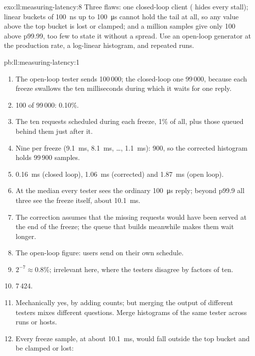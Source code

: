 \begin{solution}{exo:ll:measuring-latency:8}
Three flaws: one closed-loop client ( hides every stall); linear buckets of \qty{100}{\nano\second}
up to \qty{100}{\micro\second} cannot hold the tail at all, so any value above the top bucket is lost or clamped; and a
million samples give only 100 above p99.99, too few to state it without a spread. Use an open-loop generator at the
production rate, a log-linear histogram, and repeated runs.
\end{solution}

\begin{solution}{pb:ll:measuring-latency:1}
\begin{enumerate}
\item The open-loop tester sends 100\,000; the closed-loop one 99\,000, because each freeze swallows the ten
milliseconds during which it waits for one reply.
\item 100 of 99\,000: 0.10\%.
\item The ten requests scheduled during each freeze, 1\% of all, plus those queued behind them just after it.
\item Nine per freeze (\qty{9.1}{\milli\second}, \qty{8.1}{\milli\second}, \dots, \qty{1.1}{\milli\second}): 900, so the
corrected histogram holds 99\,900 samples.
\item \qty{0.16}{\milli\second} (closed loop), \qty{1.06}{\milli\second} (corrected) and \qty{1.87}{\milli\second} (open
loop).
\item At the median every tester sees the ordinary \qty{100}{\micro\second} reply; beyond p99.9 all three see the freeze
itself, about \qty{10.1}{\milli\second}.
\item The correction assumes that the missing requests would have been served at the end of the freeze; the queue that
builds meanwhile makes them wait longer.
\item The open-loop figure: users send on their own schedule.
\item $2^{-7} \approx 0.8\%$; irrelevant here, where the testers disagree by factors of ten.
\item 7\,424.
\item Mechanically yes, by adding counts; but merging the output of different testers mixes different questions. Merge
histograms of the same tester across runs or hosts.
\item Every freeze sample, at about \qty{10.1}{\milli\second}, would fall outside the top bucket and be clamped or lost:

\end{enumerate}
\end{solution}

